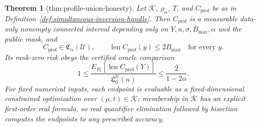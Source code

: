 \documentclass{article}
\newtheorem{theorem}{Theorem}
\begin{document}
\begin{theorem}[thm:profile-union-honesty]\label{thm:profile-union-honesty}
Let \(\overline{\mathcal K}\), \(\rho_\alpha\), \(T\), and \(C_{\mathrm{prof}}\) be as in Definition~\ref{def:simultaneous-inversion-handle}.  Then \(C_{\mathrm{prof}}\) is a measurable data-only nonempty connected interval depending only on \(Y,n,\sigma,B_{\max},\alpha\) and the public mask, and
\[
 C_{\mathrm{prof}}\in\mathfrak C_\alpha(\mathcal U),
 \qquad
 \operatorname{len}C_{\mathrm{prof}}(y)\leq2B_{\max}\quad\text{for every }y.
\]
Its rank-zero risk obeys the certified oracle comparison
\[
 1\leq
 \frac{E_{P_0}[\operatorname{len}C_{\mathrm{prof}}(Y)]}
 {\mathfrak L_0^{\mathcal U}(n)}
 \leq\frac{2}{1-2\alpha}.
\]
For fixed numerical inputs, each endpoint is evaluable as a fixed-dimensional constrained optimization over \((\mu,t)\in\overline{\mathcal K}\); membership in \(\overline{\mathcal K}\) has an explicit first-order real formula, so real quantifier elimination followed by bisection computes the endpoints to any prescribed accuracy.
\end{theorem}
\end{document}
